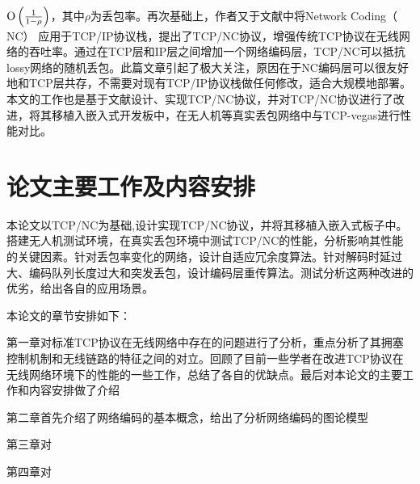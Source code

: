 ${\rm O}\left( {\frac{1}{{1{\rm{ - }}\rho }}} \right)$，其中$\rho$为丢包率。再次基础上，作者又于文献\cite{Sundararajan2009}中将Network Coding（ NC） 应用于TCP/IP协议栈，提出了TCP/NC协议，增强传统TCP协议在无线网络的吞吐率。通过在TCP层和IP层之间增加一个网络编码层，TCP/NC可以抵抗lossy网络的随机丢包。此篇文章引起了极大关注，原因在于NC编码层可以很友好地和TCP层共存，不需要对现有TCP/IP协议栈做任何修改，适合大规模地部署。本文的工作也是基于文献\cite{Sundararajan2009,Sundararajan2011}设计、实现TCP/NC协议，并对TCP/NC协议进行了改进，将其移植入嵌入式开发板中，在无人机等真实丢包网络中与TCP-vegas进行性能对比。

\section{论文主要工作及内容安排}
本论文以TCP/NC\textsuperscript{\cite{Sundararajan2009}}为基础,设计实现TCP/NC协议，并将其移植入嵌入式板子中。搭建无人机测试环境，在真实丢包环境中测试TCP/NC的性能，分析影响其性能的关键因素。针对丢包率变化的网络，设计自适应冗余度算法。针对解码时延过大、编码队列长度过大和突发丢包，设计编码层重传算法。测试分析这两种改进的优劣，给出各自的应用场景。
\par
本论文的章节安排如下：
\par
第一章对标准TCP协议在无线网络中存在的问题进行了分析，重点分析了其拥塞控制机制和无线链路的特征之间的对立。回顾了目前一些学者在改进TCP协议在无线网络环境下的性能的一些工作，总结了各自的优缺点。最后对本论文的主要工作和内容安排做了介绍
\par
第二章首先介绍了网络编码的基本概念，给出了分析网络编码的图论模型
\par
第三章对
\par
第四章对

